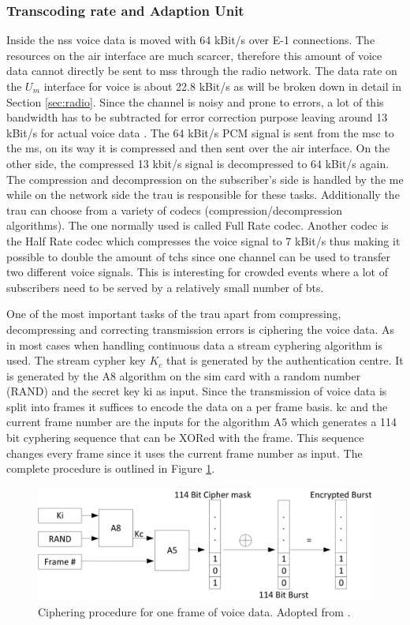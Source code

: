 \subsubsection{Transcoding rate and Adaption Unit}
Inside the \gls{nss} voice data is moved with 64 kBit/s over E-1 connections.
The resources on the air interface are much scarcer, therefore this amount of voice data cannot directly be sent to \glspl{ms} through the radio network.
The data rate on the $U_m$ interface for voice is about 22.8 kBit/s as will be broken down in detail in Section \ref{sec:radio}.
Since the channel is noisy and prone to errors, a lot of this bandwidth has to be subtracted for error correction purpose leaving around 13 kBit/s for actual voice data \cite{kommsys2006}.
The 64 kBit/s PCM signal is sent from the \gls{msc} to the \gls{ms}, on its way it is compressed and then sent over the air interface.
On the other side, the compressed 13 kbit/s signal is decompressed to 64 kBit/s again.
The compression and decompression on the subscriber's side is handled by the \gls{me} while on the network side the \gls{trau} is responsible for these tasks.
Additionally the \gls{trau} can choose from a variety of codecs (compression/decompression algorithms).
The one normally used is called Full Rate codec.
Another codec is the Half Rate codec which compresses the voice signal to 7 kBit/s thus making it possible to double the amount of \glspl{tch} since one channel can be used to transfer two different voice signals.
This is interesting for crowded events where a lot of subscribers need to be served by a relatively small number of \gls{bts}.

One of the most important tasks of the \gls{trau} apart from compressing, decompressing and correcting transmission errors is ciphering the voice data.
As in most cases when handling continuous data a stream cyphering algorithm is used.
The stream cypher key $K_c$ that is generated by the authentication centre.
It is generated by the A8 algorithm on the \gls{sim} card with a random number (RAND) and the secret key \gls{ki} as input.
Since the transmission of voice data is split into frames it suffices to encode the data on a per frame basis.
\gls{kc} and the current frame number are the inputs for the algorithm A5 which generates a 114 bit cyphering sequence that can be XORed with the frame.
This sequence changes every frame since it uses the current frame number as input.
The complete procedure is outlined in Figure \ref{fig:cypher}.

\begin{figure}
\centering
\includegraphics{../Images/Cipher}
\caption{Ciphering procedure for one frame of voice data. Adopted from \cite{kommsys2006}.}
\label{fig:cypher}
\end{figure}


